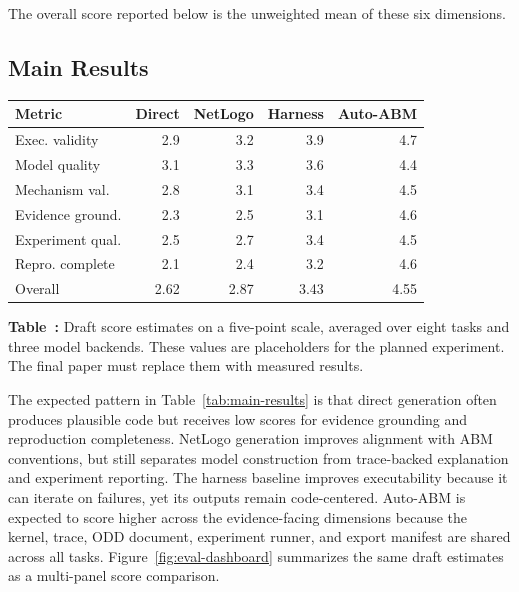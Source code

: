 \documentclass[11pt]{article}
\newcommand{\sys}{Auto-ABM}
\begin{document}
The overall score reported below is the unweighted mean of these six dimensions.

\subsection{Main Results}
\label{subsec:draft-results}

\begin{center}
  \centering
  \scriptsize
  \setlength{\tabcolsep}{2.2pt}
  \begin{tabular}{@{}lrrrr@{}}
    \toprule
    Metric & Direct & NetLogo & Harness & \sys{} \\
    \midrule
    Exec. validity & 2.9 & 3.2 & 3.9 & 4.7 \\
    Model quality & 3.1 & 3.3 & 3.6 & 4.4 \\
    Mechanism val. & 2.8 & 3.1 & 3.4 & 4.5 \\
    Evidence ground. & 2.3 & 2.5 & 3.1 & 4.6 \\
    Experiment qual. & 2.5 & 2.7 & 3.4 & 4.5 \\
    Repro. complete & 2.1 & 2.4 & 3.2 & 4.6 \\
    Overall & 2.62 & 2.87 & 3.43 & 4.55 \\
    \bottomrule
  \end{tabular}
  \label{tab:main-results}
  \vspace{0.3em}
  \parbox{\linewidth}{\small \textbf{Table~\thetable:} Draft score estimates on a five-point scale, averaged over eight tasks and three model backends. These values are placeholders for the planned experiment. The final paper must replace them with measured results.}
\end{center}

The expected pattern in Table~\ref{tab:main-results} is that direct generation often produces plausible code but receives low scores for evidence grounding and reproduction completeness. NetLogo generation improves alignment with ABM conventions, but still separates model construction from trace-backed explanation and experiment reporting. The harness baseline improves executability because it can iterate on failures, yet its outputs remain code-centered. \sys{} is expected to score higher across the evidence-facing dimensions because the kernel, trace, ODD document, experiment runner, and export manifest are shared across all tasks. Figure~\ref{fig:eval-dashboard} summarizes the same draft estimates as a multi-panel score comparison.
\end{document}
